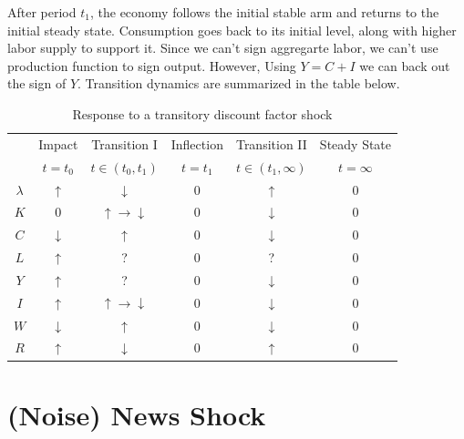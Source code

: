 \documentclass[11pt]{amsart}
\begin{document}
After period $t_1$, the economy follows the initial stable arm and returns to the initial steady state. Consumption goes back to its initial level, along with higher labor supply to support it. Since we can't sign aggregarte labor, we can't use production function to sign output. However, Using $Y = C+ I$ we can back out the sign of $Y$. Transition dynamics are summarized in the table below.   
\begin{table}[H]
	\centering
	\begin{tabular}{cccccc}
		\hline \hline 
		& Impact  & Transition I          & Inflection & Transition II & Steady State  \\
		& $t=t_0$ & $t \in (t_0, t_1)$ & $t = t_1$ & $t \in (t_1, \infty)$ & $t = \infty$ \\
		\hline 
		$\lambda$ &  $\uparrow$    &    $\downarrow$     &    0     & $\uparrow$ &0     \\
		$K$           &      0                &    $\uparrow \rightarrow \downarrow$  &   0      & $\downarrow$ &    0\\
		$C$          & $\downarrow$ &   $\uparrow$      &   0      & $\downarrow$ &    0\\
		$L$          &   $\uparrow$    &   ?      & 0     &  ? &      0\\
		$Y$          &    $\uparrow$   &    ?    &    0    &  $\downarrow$  &      0\\
		$I$           &   $\uparrow$    &  $\uparrow \rightarrow \downarrow$  & 0 & $\downarrow$  &    0\\
		$W$         & $\downarrow$ &    $\uparrow$     &    0     & $\downarrow$ &  0   \\
		$R$          &  $\uparrow$    &     $\downarrow$     &    0     & $\uparrow$  &  0 \\
		\hline
	\end{tabular}
	\caption{Response to a transitory discount factor shock}
\end{table}


\section{(Noise) News Shock}
\end{document}
